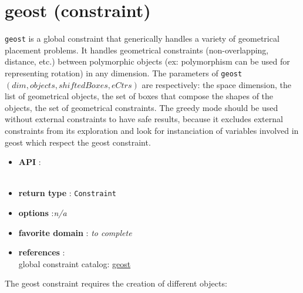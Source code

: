 \label{geost}
\hypertarget{geost}{}

\section{geost (constraint)}\label{geost:geostconstraint}\hypertarget{geost:geostconstraint}{}
\begin{notedef}
\texttt{geost} is a global constraint that generically handles a variety of geometrical placement problems. 
It handles geometrical constraints (non-overlapping, distance, etc.) between polymorphic objects (ex: polymorphism can be used for representing rotation) in any dimension.
The parameters of \texttt{geost}$(dim, objects, shiftedBoxes, eCtrs)$ are respectively:
the space dimension, the list of geometrical objects, the set of boxes that compose the shapes of the objects, the set of geometrical constraints.
The greedy mode should be used without external constraints to have safe results, because it excludes external constraints from its exploration and look for instanciation of variables involved in geost which respect the geost constraint.
\end{notedef}

\begin{itemize}
	\item \textbf{API} :\\
\\
	\item \textbf{return type} : \texttt{Constraint}
	\item \textbf{options} :\emph{n/a}
	\item \textbf{favorite domain} : \emph{to complete}
	\item \textbf{references} :\\
      global constraint catalog: \href{http://www.emn.fr/x-info/sdemasse/gccat/Cgeost.html}{geost}
\end{itemize}

The geost constraint requires the creation of different objects:

